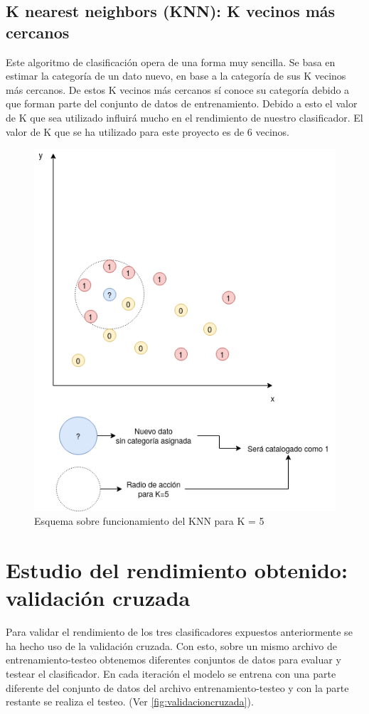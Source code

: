  
  
    \subsection{K nearest neighbors (KNN): K vecinos más cercanos}
    Este algoritmo de clasificación opera de una forma muy sencilla. Se basa en estimar la categoría de un dato nuevo, en base a la categoría de sus K vecinos más cercanos. De estos K vecinos más cercanos sí conoce su categoría debido a que forman parte del conjunto de datos de entrenamiento. Debido a esto el valor de K que sea utilizado influirá mucho en el rendimiento de nuestro clasificador. El valor de K que se ha utilizado para este proyecto es de 6 vecinos.
    \begin{figure}[!ht]
    \centering
    \includegraphics[width=1.0\textwidth]{imagenes/KNN.png}
    \caption{ Esquema sobre funcionamiento del KNN para K = 5 }
    \label{fig:knn}
    \end{figure}
    \section{Estudio del rendimiento obtenido: validación cruzada}
    Para validar el rendimiento de los tres clasificadores expuestos anteriormente se ha hecho uso de la validación cruzada. Con esto, sobre un mismo archivo de entrenamiento-testeo obtenemos diferentes conjuntos de datos para evaluar y testear el clasificador. En cada iteración el modelo se entrena con una parte diferente del conjunto de datos del archivo entrenamiento-testeo y con la parte restante se realiza el testeo. (Ver \ref{fig:validacioncruzada}).
    
